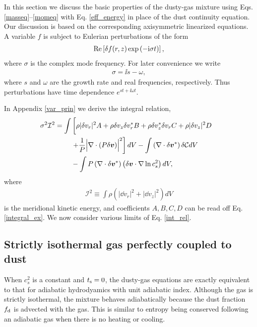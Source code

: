 In this section we discuss the basic properties of the 
dusty-gas mixture using Eqs.\ref{masseq}--\ref{momeq} with 
Eq. \ref{eff_energy} in place of the dust continuity equation. Our
discussion is based on the corresponding axisymmetric linearized
equations. A variable $f$ is
subject to Eulerian perturbations of the form 
\begin{align}
 \operatorname{Re}\left[ \delta f(r,z)\exp{\left(-\mathrm{i}\sigma t\right)}\right], 
\end{align}
where $\sigma$ is the complex mode frequency. For later convenience we
write 
\begin{align}
  \sigma = \ii s - \omega,
\end{align}
where $s$ and $\omega$ are the growth rate and real frequencies,
respectively. Thus perturbations have time dependence $e^{st +
  \ii\omega t}$.  

In Appendix
\ref{var_prin} we derive the integral relation,  
\begin{align}
  \sigma^2\mathcal{I}^2
&= \int\left[ \rho
  |\dd v_r|^2A + \rho  \dd v_z \dd v_r^* B + \rho \dd v_z^*\dd v_r C +
  \rho |\dd v_z|^2 D\phantom{\frac{1}{1}}\right. \notag\\
&\phantom{===}  \left. + \frac{1}{P}\Bigl\lvert \nabla\cdot\left(P\dd
  \bm{v}\right)\Bigr\rvert^2\right]dV  -\int \left(\nabla\cdot\dd\bm{v}^*\right)\dd\mathcal{C}dV \notag\\
&\phantom{===}
- \int P
  \left(\nabla\cdot\dd\bm{v}^*\right)\left(\dd\bm{v}\cdot\nabla\ln{c_s^2}\right)dV,\label{int_rel}
\end{align} 
where
\begin{align}
  \mathcal{I}^2 \equiv \int\rho\left(|\dd v_r|^2 + |\dd v_z|^2\right)dV
\end{align}
is the meridional kinetic energy, 
and coefficients $A,B,C,D$ can be
read off Eq. \ref{integral_ex}. %
We now consider various limits of Eq. \ref{int_rel}.    


\subsection{Strictly isothermal gas perfectly coupled to dust}\label{iso_perfect}
When $c_s^2$ is a constant and $t_\mathrm{s}=0$, the dusty-gas equations are
exactly equivalent to that for adiabatic hydrodyamics with unit adiabatic
index. Although the gas is strictly isothermal, the mixture behaves 
adiabatically because the dust fraction $f_\mathrm{d}$ is advected with 
the gas. This is similar to entropy being conserved following an
adiabatic gas when there is no heating or cooling.  

